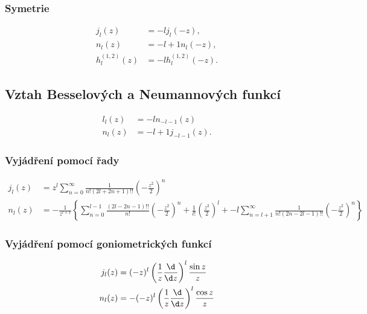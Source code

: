\subsubsection*{Symetrie}
    \begin{subequations}
        \begin{align}
            j_{l}(z)&=\minus{l}j_{l}(-z),\\
            n_{l}(z)&=\minus{l+1}n_{l}(-z),\\
            h_{l}^{(1,2)}(z)&=\minus{l}h_{l}^{(1,2)}(-z).
        \end{align}				
    \end{subequations}

\subsection*{Vztah Besselových a Neumannových funkcí}
    \begin{subequations}
        \begin{align}
            l_{l}(z)&=\minus{l}n_{-l-1}(z)\\
            n_{l}(z)&=\minus{l+1}j_{-l-1}(z).
        \end{align}
        \label{eq:BesselNeumann}
    \end{subequations}

\subsubsection*{Vyjádření pomocí řady}
    \begin{subequations}
        \begin{align}
            j_{l}(z)
                &=z^{l}\sum_{n=0}^{\infty}\frac{1}{n!\left(2l+2n+1\right)!!}\left(-\frac{z^{2}}{2}\right)^{n}\\
            n_{l}(z)
                &=-\frac{1}{z^{l+1}}\left\{
                    \sum_{n=0}^{l-1}\frac{\left(2l-2n-1\right)!!}{n!}\left(-\frac{z^{2}}{2}\right)^{n}
                    +\frac{1}{l!}\left(\frac{z^{2}}{2}\right)^{l}
                    +\minus{l}\sum_{n=l+1}^{\infty}\frac{1}{n!\left(2n-2l-1\right)!!}\left(-\frac{z^{2}}{2}\right)^{n}
                    \right\}
        \end{align}        
    \end{subequations}

\subsubsection*{Vyjádření pomocí goniometrických funkcí}
    \begin{subequations}
        \begin{align}
            j_{l}(z)
                &=(-z)^{l}\left(\frac{1}{z}\frac{\d}{\d z}\right)^{l}\frac{\sin{z}}{z}\\					
            n_{l}(z)
                &=-(-z)^{l}\left(\frac{1}{z}\frac{\d}{\d z}\right)^{l}\frac{\cos{z}}{z}
        \end{align}        
    \end{subequations}

